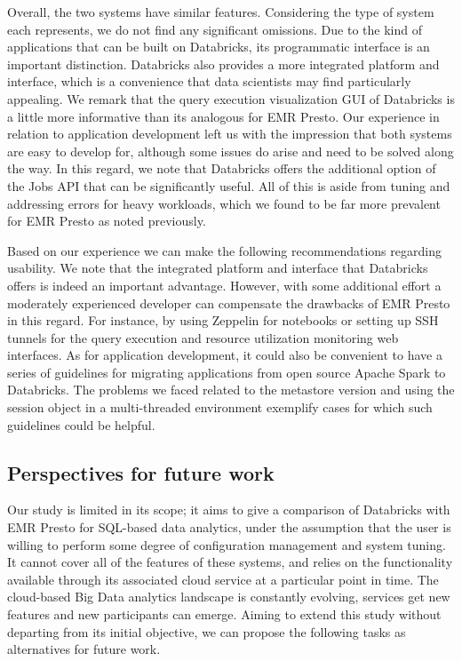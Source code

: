 Overall, the two systems have similar features. Considering the type of system each represents, we do not find any significant omissions. Due to the kind of applications that can be built on Databricks, its programmatic interface is an important distinction. Databricks also provides a more integrated platform and interface, which is a convenience that data scientists may find particularly appealing. We remark that the query execution visualization GUI of Databricks is a little more informative than its analogous for EMR Presto. Our experience in relation to application development left us with the impression that both systems are easy to develop for, although some issues do arise and need to be solved along the way. In this regard, we note that Databricks offers the additional option of the Jobs API that can be significantly useful. All of this is aside from tuning and addressing errors for heavy workloads, which we found to be far more prevalent for EMR Presto as noted previously.

Based on our experience we can make the following recommendations regarding usability. We note that the integrated platform and interface that Databricks offers is indeed an important advantage. However, with some additional effort a moderately experienced developer can compensate the drawbacks of EMR Presto in this regard. For instance, by using Zeppelin for notebooks or setting up SSH tunnels for the query execution and resource utilization monitoring web interfaces. As for application development, it could also be convenient to have a series of guidelines for migrating applications from open source Apache Spark to Databricks. The problems we faced related to the metastore version and using the session object in a multi-threaded environment exemplify cases for which such guidelines could be helpful.

\subsection{Perspectives for future work}

Our study is limited in its scope; it aims to give a comparison of Databricks with EMR Presto for SQL-based data analytics, under the assumption that the user is willing to perform some degree of configuration management and system tuning. It cannot cover all of the features of these systems, and relies on the functionality available through its associated cloud service at a particular point in time. The cloud-based Big Data analytics landscape is constantly evolving, services get new features and new participants can emerge. Aiming to extend this study without departing from its initial objective, we can propose the following tasks as alternatives for future work.

